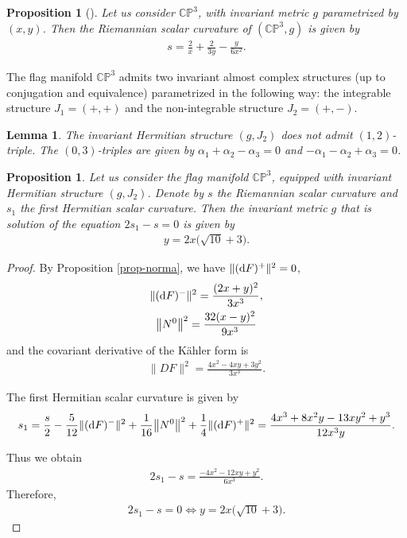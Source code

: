 \documentclass[pdftex]{sigma}%
\numberwithin{equation}{section}
\newtheorem{Lemma}[Theorem]{Lemma}
\newtheorem{Proposition}[Theorem]{Proposition}
 { \theoremstyle{definition}
\newtheorem{Definition}[Theorem]{Definition}
\newtheorem{Question}[Theorem]{Question}
\newtheorem*{Notation}{Notation}
\newtheorem{Example}[Theorem]{Example}
\newtheorem{Remark}[Theorem]{Remark} }
\begin{document}
\begin{Proposition}[\cite{grego}]
Let us consider $\mathbb{CP}^3$, with invariant metric $g$ parametrized by $(x,y)$. Then the Riemannian scalar curvature of $(\mathbb{CP}^3,g)$ is given by
\begin{gather*}
s= \frac{2}{x}+\frac{2}{3y} - \frac{y}{6x^2}.
\end{gather*}
\end{Proposition}

The flag manifold $\mathbb{CP}^{3}$ admits two invariant almost complex structures (up to conjugation and equivalence) parametrized in the following way: the integrable structure $J_1=(+,+)$ and the non-integrable structure $J_2=(+,-)$.

\begin{Lemma}
The invariant Hermitian structure $(g, J_{2})$ does not admit $(1,2)$-triple. The $(0,3)$-triples are given by $\alpha_{1}+\alpha_{2}-\alpha_{3}=0$ and $-\alpha_{1}-\alpha_{2}+\alpha_{3}=0$.
\end{Lemma}

\begin{Proposition}\label{prop-cp3-j2}
Let us consider the flag manifold $\mathbb{CP}^3$, equipped with invariant Hermitian structure $(g, J_{2})$. Denote by $s$ the Riemannian scalar curvature and $s_1$ the first Hermitian scalar curvature. Then the invariant metric $g$ that is solution of the equation $2s_1-s=0$ is given by
 \begin{gather}
y=2x\big(\sqrt{10} +3\big).
\end{gather}
\end{Proposition}
\begin{proof}
By Proposition \ref{prop-norma}, we have $\|({\rm d}F)^{+}\|^{2}=0$,
\begin{gather*}
\|({\rm d}F)^{-}\|^{2}=\frac{(2 x+y)^2}{3 x^3},
\\
\big\|N^{0}\big\|^{2}=\frac{32 (x-y)^2}{9 x^3}
\end{gather*}
and the covariant derivative of the K\"ahler form is
\begin{gather*}
\|DF\|^2=\frac{4 x^2-4 x y+3 y^2}{3 x^3}.
\end{gather*}

The first Hermitian scalar curvature is given by
\begin{align*}
s_{1}=\dfrac{s}{2}-\dfrac{5}{12}\|({\rm d}F)^{-}\|^{2}+\dfrac{1}{16}\big\|N^{0}\big\|^{2}+\dfrac{1}{4}\|({\rm d}F)^{+}\|^{2}
=\frac{4 x^3+8 x^2 y-13 x y^2+y^3}{12 x^3 y}.
\end{align*}

Thus we obtain
\begin{gather*}
2s_{1}-s=\frac{-4 x^2-12 x y+y^2}{6 x^3}.
\end{gather*}
Therefore,
\begin{gather*}
2s_{1}-s=0\Leftrightarrow y=2x\big(\sqrt{10} +3\big).\tag*{\qed}
\end{gather*}
\renewcommand{\qed}{}
\end{proof}
\end{document}
